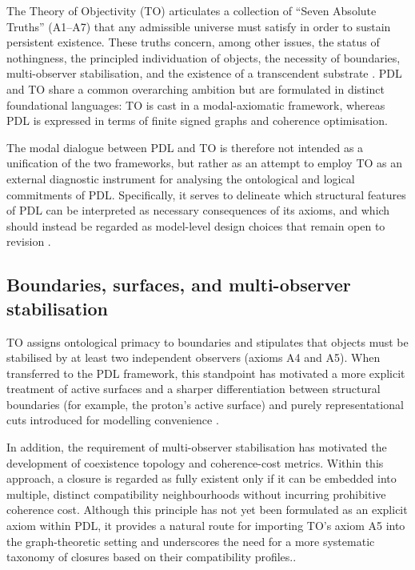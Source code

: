 \documentclass{article}
\begin{document}
The Theory of Objectivity (TO) articulates a collection of “Seven Absolute Truths” (A1–A7) that any admissible universe must satisfy in order to sustain persistent existence. These truths concern, among other issues, the status of nothingness, the principled individuation of objects, the necessity of boundaries, multi-observer stabilisation, and the existence of a transcendent substrate \cite{PDL_TO_dialogue}. PDL and TO share a common overarching ambition but are formulated in distinct foundational languages: TO is cast in a modal-axiomatic framework, whereas PDL is expressed in terms of finite signed graphs and coherence optimisation.

The modal dialogue between PDL and TO is therefore not intended as a unification of the two frameworks, but rather as an attempt to employ TO as an external diagnostic instrument for analysing the ontological and logical commitments of PDL. Specifically, it serves to delineate which structural features of PDL can be interpreted as necessary consequences of its axioms, and which should instead be regarded as model-level design choices that remain open to revision \cite{PDL_TO_dialogue,PDL_position}.

\subsection{Boundaries, surfaces, and multi-observer stabilisation}
\label{subsec:boundaries_multiobserver}

TO assigns ontological primacy to boundaries and stipulates that objects must be stabilised by at least two independent observers (axioms A4 and A5). When transferred to the PDL framework, this standpoint has motivated a more explicit treatment of active surfaces and a sharper differentiation between structural boundaries (for example, the proton’s active surface) and purely representational cuts introduced for modelling convenience
\cite{PDL_TO_dialogue,PDL_Main_2026}.

In addition, the requirement of multi-observer stabilisation has motivated the development of coexistence topology and coherence-cost metrics. Within this approach, a closure is regarded as fully existent only if it can be embedded into multiple, distinct compatibility neighbourhoods without incurring prohibitive coherence cost. Although this principle has not yet been formulated as an explicit axiom within PDL, it provides a natural route for importing TO’s axiom A5 into the graph-theoretic setting and underscores the need for a more systematic taxonomy of closures based on their compatibility profiles.\cite{Coherence_Leakage_18_2026,PDL_position}.
\end{document}
